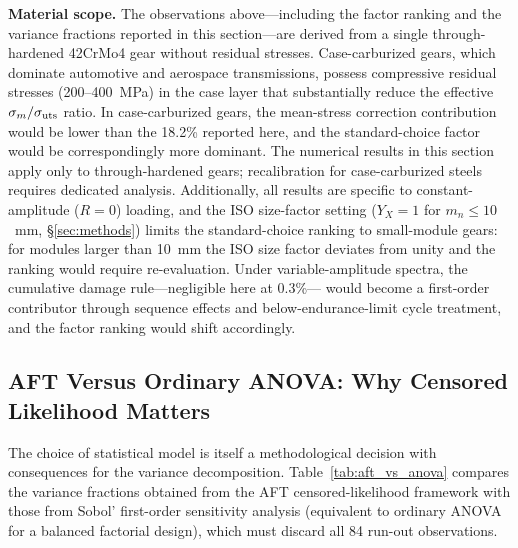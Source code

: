 \documentclass[twocolumn,12pt,a4paper]{article}
\begin{document}
\textbf{Material scope.} The observations
above---including the factor ranking and the variance
fractions reported in this section---are derived from a single through-hardened
42CrMo4 gear without residual stresses. Case-carburized gears, which
dominate automotive and aerospace transmissions, possess compressive
residual stresses (200--400~MPa) in the case layer that substantially
reduce the effective $\sigma_m/\sigma_{\rm uts}$ ratio. In
case-carburized gears, the mean-stress correction contribution would
be lower than the 18.2\% reported here, and the standard-choice
factor would be correspondingly more dominant. The numerical results in this section apply only to
through-hardened gears; recalibration for case-carburized steels
requires dedicated analysis. Additionally, all results are specific
to constant-amplitude ($R=0$) loading, and the ISO size-factor setting
($Y_X=1$ for $m_n \leq 10$~mm, \S\ref{sec:methods}) limits the
standard-choice ranking to small-module gears: for modules larger than
10~mm the ISO size factor deviates from unity and the ranking would
require re-evaluation. Under variable-amplitude
spectra, the cumulative damage rule---negligible here at 0.3\%---%
would become a first-order contributor through sequence effects and
below-endurance-limit cycle treatment, and the factor ranking would
shift accordingly.

\subsection{AFT Versus Ordinary ANOVA: Why Censored Likelihood Matters}
\label{sec:aft_vs_anova}

The choice of statistical model is itself a methodological decision
with consequences for the variance decomposition. Table~\ref{tab:aft_vs_anova}
compares the variance fractions obtained from the AFT censored-likelihood
framework with those from Sobol' first-order sensitivity analysis
(equivalent to ordinary ANOVA for a balanced factorial design), which
must discard all 84 run-out observations.
\end{document}

